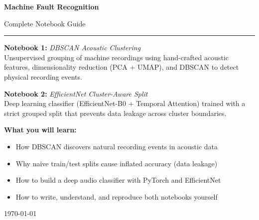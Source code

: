 \documentclass[12pt,a4paper]{article}
\begin{document}

\begin{titlepage}
  \centering
  \vspace*{1.5cm}
  {\Huge\bfseries\color{primary} Machine Fault Recognition\par}
  \vspace{0.5cm}
  {\LARGE\color{accent} Complete Notebook Guide\par}
  \vspace{0.3cm}
  \textcolor{codegray}{\rule{0.6\textwidth}{1.5pt}}
  \vspace{0.8cm}

  \begin{tcolorbox}[
    colback=notebookbg, colframe=primary, arc=6pt,
    width=0.85\textwidth, boxrule=1pt
  ]
  \centering
  \textbf{\large Notebook 1:} \textit{DBSCAN Acoustic Clustering} \\[4pt]
  \footnotesize Unsupervised grouping of machine recordings using hand-crafted acoustic features,
  dimensionality reduction (PCA + UMAP), and DBSCAN to detect physical recording events.
  \vspace{8pt}

  \textbf{\large Notebook 2:} \textit{EfficientNet Cluster-Aware Split} \\[4pt]
  \footnotesize Deep learning classifier (EfficientNet-B0 + Temporal Attention) trained with
  a strict grouped split that prevents data leakage across cluster boundaries.
  \end{tcolorbox}

  \vspace{1cm}
  \begin{successbox}
    \textbf{What you will learn:}
    \begin{itemize}[leftmargin=*, nosep]
      \item How DBSCAN discovers natural recording events in acoustic data
      \item Why naive train/test splits cause inflated accuracy (data leakage)
      \item How to build a deep audio classifier with PyTorch and EfficientNet
      \item How to write, understand, and reproduce both notebooks yourself
    \end{itemize}
  \end{successbox}

  \vfill
  {\color{codegray}\today}
\end{titlepage}
\end{document}
